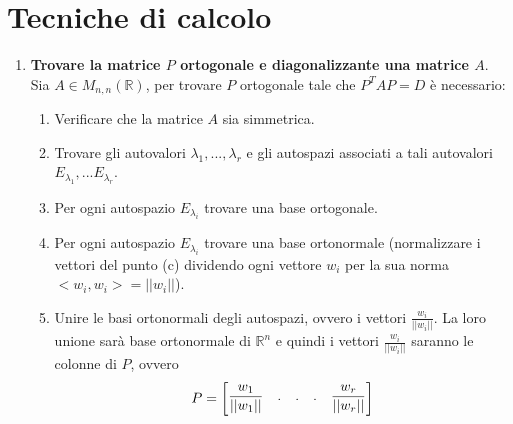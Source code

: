 \documentclass[12pt,a4paper,oneside]{book}
\begin{document}
\newpage
			  \section{Tecniche di calcolo}
			  
\begin{enumerate}
\item \textbf{Trovare la matrice $P$ ortogonale e diagonalizzante una matrice $A$}. \linebreak
	  Sia $A\in M_{n, n}(\mathbb{R})$, per trovare $P$ ortogonale tale che $P^TAP=D$ è necessario:
	  \begin{enumerate}
	  \item Verificare che la matrice $A$ sia simmetrica.
	  \item Trovare gli autovalori $\lambda_1, ..., \lambda_r$ e gli autospazi associati a tali autovalori
		    $E_{\lambda_1}, ... E_{\lambda_r}$.
	  \item Per ogni autospazio $E_{\lambda_i}$ trovare una base ortogonale.
	  \item Per ogni autospazio $E_{\lambda_i}$ trovare una base ortonormale (normalizzare i vettori del 
		    punto (c) dividendo ogni vettore $w_i$ per la sua norma $<w_i, w_i> = ||w_i||$).
	  \item Unire le basi ortonormali degli autospazi, ovvero i vettori $\frac{w_i}{||w_i||}$. La loro
		    unione sarà base ortonormale di $\mathbb{R}^n$ e quindi i vettori $\frac{w_i}{||w_i||}$ saranno
		    le colonne di $P$, ovvero $$ P=\begin{bmatrix}
		    \mathlarger{\frac{w_1}{||w_1||}} & . & . & . & \mathlarger{\frac{w_r}{||w_r||}} \end{bmatrix}$$
	  \end{enumerate}

\end{enumerate}
\end{document}
